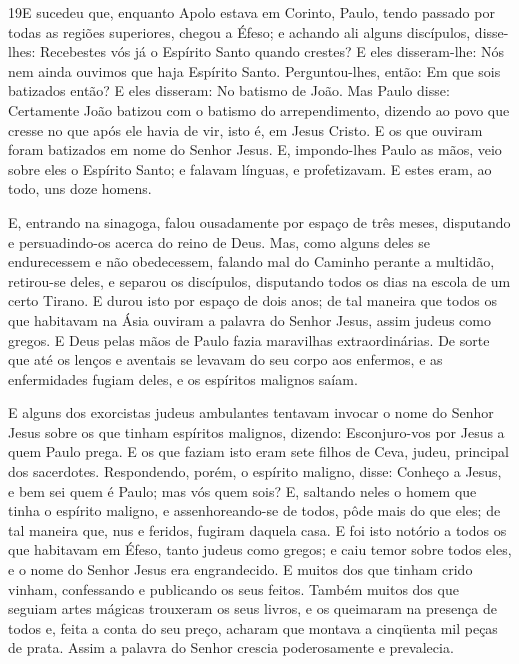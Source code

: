 \medskip

\lettrine{19} E sucedeu que, enquanto Apolo estava em Corinto,
Paulo, tendo passado por todas as regiões superiores, chegou a
Éfeso; e achando ali alguns discípulos, disse-lhes: Recebestes
vós já o Espírito Santo quando crestes? E eles disseram-lhe: Nós nem
ainda ouvimos que haja Espírito Santo. Perguntou-lhes, então: Em
que sois batizados então? E eles disseram: No batismo de João.
Mas Paulo disse: Certamente João batizou com o batismo do
arrependimento, dizendo ao povo que cresse no que após ele havia de
vir, isto é, em Jesus Cristo. E os que ouviram foram batizados
em nome do Senhor Jesus. E, impondo-lhes Paulo as mãos, veio
sobre eles o Espírito Santo; e falavam línguas, e profetizavam.
E estes eram, ao todo, uns doze homens.

E, entrando na sinagoga, falou ousadamente por espaço de três
meses, disputando e persuadindo-os acerca do reino de Deus. Mas,
como alguns deles se endurecessem e não obedecessem, falando mal do
Caminho perante a multidão, retirou-se deles, e separou os
discípulos, disputando todos os dias na escola de um certo Tirano.
E durou isto por espaço de dois anos; de tal maneira que
todos os que habitavam na Ásia ouviram a palavra do Senhor Jesus,
assim judeus como gregos. E Deus pelas mãos de Paulo fazia
maravilhas extraordinárias. De sorte que até os lenços e
aventais se levavam do seu corpo aos enfermos, e as enfermidades
fugiam deles, e os espíritos malignos saíam.

E alguns dos exorcistas judeus ambulantes tentavam invocar o nome
do Senhor Jesus sobre os que tinham espíritos malignos, dizendo:
Esconjuro-vos por Jesus a quem Paulo prega. E os que faziam
isto eram sete filhos de Ceva, judeu, principal dos sacerdotes.
Respondendo, porém, o espírito maligno, disse: Conheço a
Jesus, e bem sei quem é Paulo; mas vós quem sois? E, saltando
neles o homem que tinha o espírito maligno, e assenhoreando-se de
todos, pôde mais do que eles; de tal maneira que, nus e feridos,
fugiram daquela casa. E foi isto notório a todos os que
habitavam em Éfeso, tanto judeus como gregos; e caiu temor sobre
todos eles, e o nome do Senhor Jesus era engrandecido. E
muitos dos que tinham crido vinham, confessando e publicando os seus
feitos. Também muitos dos que seguiam artes mágicas trouxeram
os seus livros, e os queimaram na presença de todos e, feita a conta
do seu preço, acharam que montava a cinqüenta mil peças de prata.
Assim a palavra do Senhor crescia poderosamente e prevalecia.

